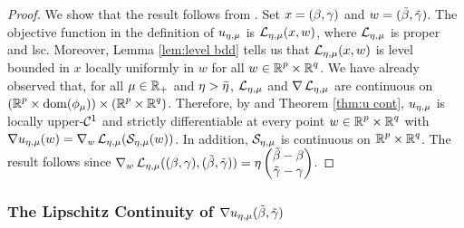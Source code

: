 \begin{proof} 
We show that the result follows from \cite[Theorem 10.58]{rockafellar2009variational}.
Set $x=\bg$ and $w=\tbg$. The objective function in the definition of
$\uemu$ is $\LL_\emu(x,w)$, where $\LL_\emu$  is proper and lsc.
Moreover, Lemma \ref{lem:level bdd} tells us that
$\LL_\emu(x,w)$ is level bounded in $x$ locally uniformly in $w$
for all $w\in \Rp\times\Rq$. We have already observed that, 
for all $\mu\in\R_+$ and $\eta>\blam$, $\LL_{\emu}$ and  $\nabla \LL_{\emu}$ 
are continuous
on $(\Rp\times\dom(\phimu))\times(\Rp\times\Rq)$.
Therefore, by \cite[Theorem 10.58]{rockafellar2009variational}
and Theorem \ref{thm:u cont}, $\uemu$ is locally upper-$\CC^1$
and strictly differentiable at every point $w\in\Rp\times\Rq$ with
$\nabla \uemu(w)=\nabla _w\LL_{\emu}(\SS_\emu(w))$.
In addition, $\SS_\emu$ is continuous on 
$\Rp\times\Rq$.
The result follows since $\nabla _w\LL_{\emu}(\bg,\tbg)
=\eta\begin{pmatrix}\tbeta-\beta\\ \tgam-\gam\end{pmatrix}
$.
\end{proof}

\subsubsection{The Lipschitz Continuity of \texorpdfstring{$\nabla \uemu\tbg$}{}}

